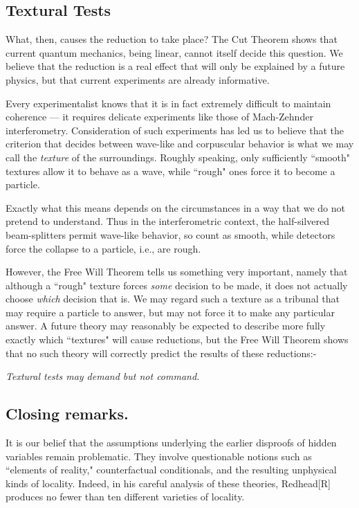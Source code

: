 \documentclass[12pt]{amsart}
\begin{document}
\subsection {Textural Tests}

What, then, causes the reduction to take place?  The Cut Theorem shows that current
quantum mechanics, being linear, cannot itself decide this question. We believe that
the reduction is a real effect that will only be explained by a future physics, 
but that current experiments are already informative.  

Every experimentalist knows that it is in fact extremely difficult to maintain 
coherence --- it requires delicate experiments like those of Mach-Zehnder 
interferometry. Consideration of such experiments has led us to believe that the
criterion that decides between wave-like and corpuscular behavior is what we 
may call the {\em texture} of the surroundings.  Roughly speaking, only sufficiently
``smooth" textures allow it to behave as a wave, while ``rough" ones force it to become
a particle.  

Exactly what this means depends on the circumstances in a way that we do not pretend to understand.  Thus in the interferometric context, the half-silvered beam-splitters 
permit wave-like behavior, so count as smooth, while detectors force the collapse
to a particle, i.e., are rough.  

However, the Free Will Theorem tells us something very important, namely that although a
``rough" texture forces {\em some} decision to be made, it does not actually 
choose {\em which} decision that is.  We may regard such a texture as a tribunal
that may require a particle to answer, but may not force it to make any 
particular answer.  A future theory may reasonably be expected to describe more 
fully exactly which ``textures" will cause reductions, but the Free Will Theorem 
shows that no such theory will correctly predict the results of these reductions:-
 
 {\em Textural tests may demand but not command.}

\subsection {Closing remarks.}

It is our belief that the assumptions underlying the earlier disproofs of 
hidden variables remain problematic.  They involve questionable notions such
as ``elements of reality," counterfactual conditionals, and the resulting
unphysical kinds of locality.  Indeed, in his careful analysis of these 
theories, Redhead[R] produces no fewer than ten different varieties
of locality.
  
\end{document}
